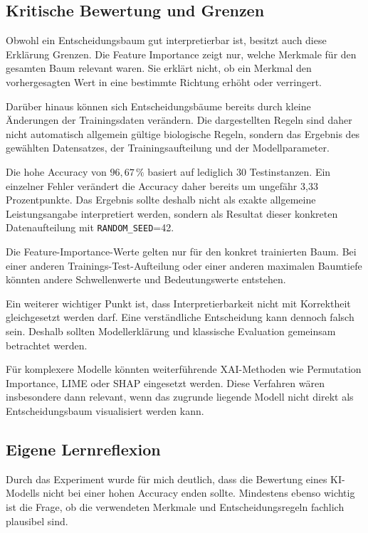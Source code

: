 \documentclass[12pt,a4paper]{article}
\begin{document}
\subsection{Kritische Bewertung und Grenzen}

Obwohl ein Entscheidungsbaum gut interpretierbar ist, besitzt auch
diese Erklärung Grenzen. Die Feature Importance zeigt nur, welche
Merkmale für den gesamten Baum relevant waren. Sie erklärt nicht,
ob ein Merkmal den vorhergesagten Wert in eine bestimmte Richtung
erhöht oder verringert.

Darüber hinaus können sich Entscheidungsbäume bereits durch kleine
Änderungen der Trainingsdaten verändern. Die dargestellten Regeln
sind daher nicht automatisch allgemein gültige biologische Regeln,
sondern das Ergebnis des gewählten Datensatzes, der
Trainingsaufteilung und der Modellparameter.

Die hohe Accuracy von \(96{,}67\,\%\) basiert auf lediglich
30 Testinstanzen. Ein einzelner Fehler verändert die Accuracy daher
bereits um ungefähr 3{,}33 Prozentpunkte. Das Ergebnis sollte deshalb
nicht als exakte allgemeine Leistungsangabe interpretiert werden,
sondern als Resultat dieser konkreten Datenaufteilung mit
\texttt{RANDOM\_SEED}=42.

Die Feature-Importance-Werte gelten nur für den konkret trainierten
Baum. Bei einer anderen Trainings-Test-Aufteilung oder einer anderen
maximalen Baumtiefe könnten andere Schwellenwerte und
Bedeutungswerte entstehen.

Ein weiterer wichtiger Punkt ist, dass Interpretierbarkeit nicht
mit Korrektheit gleichgesetzt werden darf. Eine verständliche
Entscheidung kann dennoch falsch sein. Deshalb sollten
Modellerklärung und klassische Evaluation gemeinsam betrachtet
werden.

Für komplexere Modelle könnten weiterführende XAI-Methoden wie
Permutation Importance, LIME oder SHAP eingesetzt werden. Diese
Verfahren wären insbesondere dann relevant, wenn das zugrunde
liegende Modell nicht direkt als Entscheidungsbaum visualisiert
werden kann.

\subsection{Eigene Lernreflexion}

Durch das Experiment wurde für mich deutlich, dass die Bewertung
eines KI-Modells nicht bei einer hohen Accuracy enden sollte.
Mindestens ebenso wichtig ist die Frage, ob die verwendeten
Merkmale und Entscheidungsregeln fachlich plausibel sind.
\end{document}

